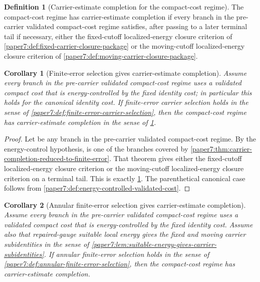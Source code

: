 \documentclass[11pt]{amsart}
\def\({}%
\def\){}%
\theoremstyle{plain}
\newtheorem{corollary}[corollary]{Corollary}
\theoremstyle{definition}
\newtheorem{definition}[definition]{Definition}
\theoremstyle{remark}
\begin{document}
\begin{definition}[Carrier-estimate completion for the compact-cost regime]
\label{paper7:def:carrier-estimate-completion}
The compact-cost regime has carrier-estimate completion if every branch in the
pre-carrier validated compact-cost regime satisfies, after passing to a later
terminal tail if necessary, either the fixed-cutoff localized-energy closure criterion of
\cref{paper7:def:fixed-carrier-closure-package} or the moving-cutoff
localized-energy closure criterion of \cref{paper7:def:moving-carrier-closure-package}.
\end{definition}

\begin{corollary}[Finite-error selection gives carrier-estimate completion]
\label{paper7:cor:finite-error-selection-gives-carrier-completion}
Assume every branch in the pre-carrier validated compact-cost regime uses a
validated compact cost that is energy-controlled by the fixed identity cost; in
particular this holds for the canonical identity cost.  If finite-error carrier
selection holds in the sense of
\cref{paper7:def:finite-error-carrier-selection}, then the compact-cost regime
has carrier-estimate completion in the sense of
\cref{paper7:def:carrier-estimate-completion}.
\end{corollary}

\begin{proof}
Let \(\omega\) be any branch in the pre-carrier validated compact-cost regime.
By the energy-control hypothesis, \(\omega\) is one of the branches covered by
\cref{paper7:thm:carrier-completion-reduced-to-finite-error}.  That theorem
gives either the fixed-cutoff localized-energy closure criterion or the moving-cutoff
localized-energy closure criterion on a terminal tail.  This is exactly
\cref{paper7:def:carrier-estimate-completion}.  The parenthetical canonical
case follows from
\cref{paper7:def:energy-controlled-validated-cost}.
\end{proof}

\begin{corollary}[Annular finite-error selection gives carrier-estimate completion]
\label{paper7:cor:annular-finite-error-selection-gives-carrier-completion}
Assume every branch in the pre-carrier validated compact-cost regime uses a
validated compact cost that is energy-controlled by the fixed identity cost.
Assume also that repaired-gauge suitable local energy gives the fixed and
moving carrier subidentities in the sense of
\cref{paper7:lem:suitable-energy-gives-carrier-subidentities}.  If annular
finite-error selection holds in the sense of
\cref{paper7:def:annular-finite-error-selection}, then the compact-cost regime
has carrier-estimate completion.
\end{corollary}
\end{document}
